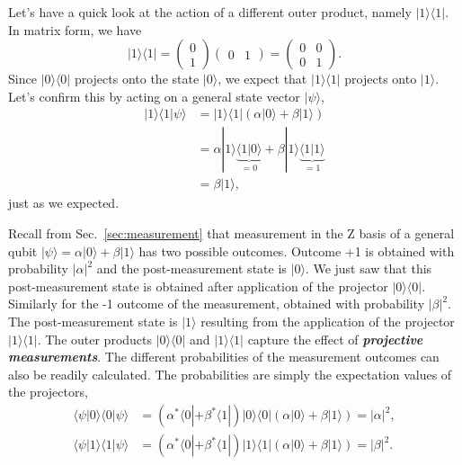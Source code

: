 Let's have a quick look at the action of a different outer product, namely $|1\rangle\langle1|$.
In matrix form, we have
\begin{equation}
    |1\rangle\langle1| = \begin{pmatrix} 0 \\ 1 \end{pmatrix} \begin{pmatrix} 0 & 1 \end{pmatrix} = \begin{pmatrix} 0 & 0  \\ 0 & 1 \end{pmatrix}.
\end{equation}
Since $|0\rangle\langle0|$ projects onto the state $|0\rangle$, we expect that $|1\rangle\langle1|$ projects onto $|1\rangle$.
Let's confirm this by acting on a general state vector $|\psi\rangle$,
\begin{align}
    |1\rangle\langle1|\psi\rangle & = |1\rangle\langle1| \left( \alpha|0\rangle + \beta|1\rangle \right) \label{eq:projector_11}\\
    & = \alpha |1\rangle\underbrace{\langle1|0\rangle}_{=0} + \beta |1\rangle\underbrace{\langle1|1\rangle}_{=1} \nonumber\\
    & = \beta|1\rangle, \nonumber
\end{align}
just as we expected.

Recall from Sec.~\ref{sec:measurement} that measurement in the Z basis of a general qubit $|\psi\rangle = \alpha |0\rangle + \beta |1\rangle$ has two possible outcomes.
Outcome +1 is obtained with probability $|\alpha|^2$ and the post-measurement state is $|0\rangle$.
We just saw that this post-measurement state is obtained after application of the projector $|0\rangle\langle0|$.
Similarly for the -1 outcome of the measurement, obtained with probability $|\beta|^2$.
The post-measurement state is $|1\rangle$ resulting from the application of the projector $|1\rangle\langle1|$.
The outer products $|0\rangle\langle0|$ and $|1\rangle\langle1|$ capture the effect of \textit{\textbf{projective measurements}}.
The different probabilities of the measurement outcomes can also be readily calculated.
The probabilities are simply the expectation values of the projectors,
\begin{align}
    \langle \psi | 0 \rangle \langle 0 | \psi \rangle & = \left( \alpha^*\langle0| + \beta^*\langle1| \right) |0\rangle\langle0| \left( \alpha |0\rangle + \beta |1\rangle \right) = |\alpha|^2, \\
    \langle \psi | 1 \rangle \langle 1 | \psi \rangle & = \left( \alpha^*\langle0| + \beta^*\langle1| \right) |1\rangle\langle1| \left( \alpha |0\rangle + \beta |1\rangle \right) = |\beta|^2.
\end{align}

